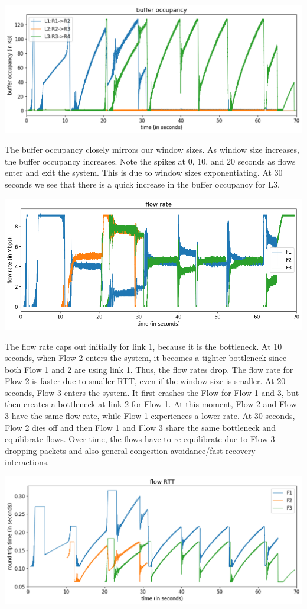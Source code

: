 \documentclass{article}
\begin{document}
\includegraphics[width = \textwidth]{"test_case2_reno buffer occupancy"}

The buffer occupancy closely mirrors our window sizes. As window size increases, the buffer occupancy increases. Note the spikes at 0, 10, and 20 seconds as flows enter and exit the system. This is due to window sizes exponentiating. At 30 seconds we see that there is a quick increase in the buffer occupancy for L3.

\includegraphics[width = \textwidth]{"test_case2_reno flow rate"}

The flow rate caps out initially for link 1, because it is the bottleneck. At 10 seconds, when Flow 2 enters the system, it becomes a tighter bottleneck since both Flow 1 and 2 are using link 1. Thus, the flow rates drop. The flow rate for Flow 2 is faster due to smaller RTT, even if the window size is smaller. At 20 seconds, Flow 3 enters the system. It first crashes the Flow for Flow 1 and 3, but then creates a bottleneck at link 2 for Flow 1. At this moment, Flow 2 and Flow 3 have the same flow rate, while Flow 1 experiences a lower rate. At 30 seconds, Flow 2 dies off and then Flow 1 and Flow 3 share the same bottleneck and equilibrate flows.  Over time, the flows have to re-equilibrate due to Flow 3 dropping packets and also general congestion avoidance/fast recovery interactions.

\includegraphics[width = \textwidth]{"test_case2_reno flow RTT"}
\end{document}
